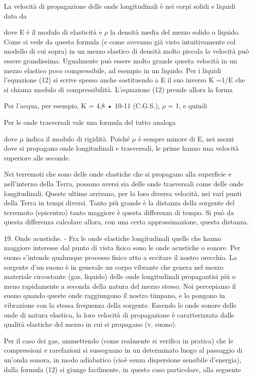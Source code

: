 \documentclass[a4paper]{article}
\begin{document}
La velocità di propagazione delle onde longitudinali è nei corpi solidi e liquidi data da

dove E è il modulo di elasticità e $\rho$ la densità media del mezzo solido o liquido. Come si vede da questa formula (e come avevamo già visto intuitivamente col modello di cui sopra) in un mezzo elastico di densità molto piccola la velocità può essere grandissima. Ugualmente può essere molto grande questa velocità in un mezzo elastico poco compressibile, ad esempio in un liquido. Per i liquidi l'equazione (12) si scrive spesso anche sostituendo a E il suo inverso K =1/E che si chiama modulo di compressibilità. L'equazione (12) prende allora la forma

Per l'acqua, per esempio, K = 4,8 • 10-11 (C.G.S.), $\rho$ = 1, e quindi

Per le onde trasversali vale una formula del tutto analoga

dove $\mu$ indica il modulo di rigidità. Poiché $\mu$ è sempre minore di E, nei mezzi dove si propagano onde longitudinali e trasversali, le prime hanno una velocità superiore alle seconde.

Nei terremoti che sono delle onde elastiche che si propagano alla superficie e nell'interno della Terra, possono aversi sia delle onde trasversali come delle onde longitudinali. Queste ultime arrivano, per la loro diversa velocità, nei varî punti della Terra in tempi diversi. Tanto più grande è la distanza della sorgente del terremoto (epicentro) tanto maggiore è questa differenza di tempo. Si può da questa differenza calcolare allora, con una certa approssimazione, questa distanza.

19. Onde acustiche. - Fra le onde elastiche longitudinali quelle che hanno maggiore interesse dal punto di vista fisico sono le onde acustiche o sonore. Per suono s'intende qualunque processo fisico atto a eccitare il nostro orecchio. La sorgente d'un suono è in generale un corpo vibrante che genera nel mezzo materiale circostante (gas, liquido) delle onde longitudinali propagantisi più o meno rapidamente a seconda della natura del mezzo stesso. Noi percepiamo il suono quando queste onde raggiungono il nostro timpano, e lo pongono in vibrazione con la stessa frequenza della sorgente. Essendo le onde sonore delle onde di natura elastica, la loro velocità di propagazione è caratterizzata dalle qualità elastiche del mezzo in cui si propagano (v. suono).

Per il caso dei gas, ammettendo (come realmente si verifica in pratica) che le compressioni e rarefazioni si susseguano in un determinato luogo al passaggio di un'onda sonora, in modo adiabatico (cioè senza dispersione sensibile d'energia), dalla formula (12) si giunge facilmente, in questo caso particolare, alla seguente
\end{document}
